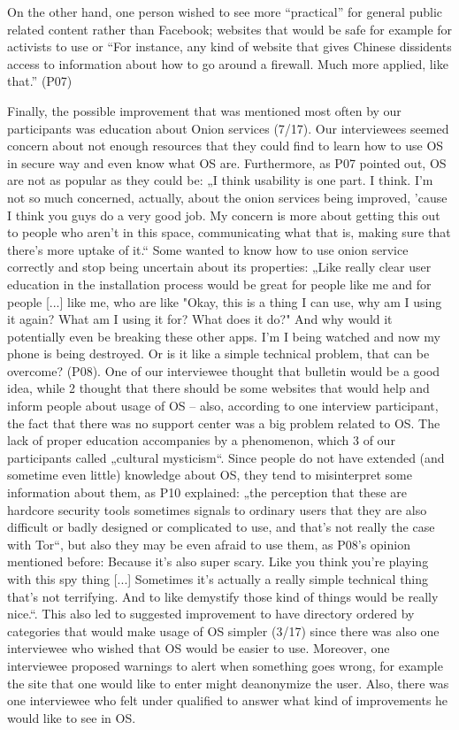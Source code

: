  On the other hand, one person wished to see more “practical” for general public related content rather than Facebook; websites that would be safe for example for activists to use or “For instance, any kind of website that gives Chinese dissidents access to information about how to go around a firewall. Much more applied, like that.” (P07)

Finally, the possible improvement that was mentioned most often by our participants was education about Onion services (7/17). Our interviewees seemed concern about not enough resources that they could find to learn how to use OS in secure way and even know what OS are. Furthermore, as P07 pointed out, OS are not as popular as they could be: „I think usability is one part. I think. I'm not so much concerned, actually, about the onion services being improved, 'cause I think you guys do a very good job. My concern is more about getting this out to people who aren't in this space, communicating what that is, making sure that there's more uptake of it.“
 Some wanted to know how to use onion service correctly and stop being uncertain about its properties: „Like really clear user education in the installation process would be great for people like me and for people [...] like me, who are like "Okay, this is a thing I can use, why am I using it again? What am I using it for? What does it do?" And why would it potentially even be breaking these other apps. I'm I being watched and now my phone is being destroyed. Or is it like a simple technical problem, that can be overcome? (P08). One of our interviewee thought that bulletin would be a good idea, while 2 thought that there should be some websites that would help and inform people about usage of OS – also, according to one interview participant, the fact that there was no support center was a big problem related to OS. 
The lack of proper education accompanies by a phenomenon, which 3 of our participants called „cultural mysticism“. Since people do not have extended (and sometime even little) knowledge about OS, they tend to misinterpret some information about them, as P10 explained: „the perception that these are hardcore security tools sometimes signals to ordinary users that they are also difficult or badly designed or complicated to use, and that's not really the case with Tor“, but also they may be even afraid to use them, as P08’s opinion mentioned before: Because it's also super scary. Like you think you're playing with this spy thing [...] Sometimes it's actually a really simple technical thing that's not terrifying. And to like demystify those kind of things would be really nice.“. This also led to suggested improvement to have directory ordered by categories that would make usage of OS simpler (3/17) since there was also one interviewee who wished that OS would be easier to use. Moreover, one interviewee proposed warnings to alert when something goes wrong, for example the site that one would like to enter might deanonymize the user. Also, there was one interviewee who felt under qualified to answer what kind of improvements he would like to see in OS.
